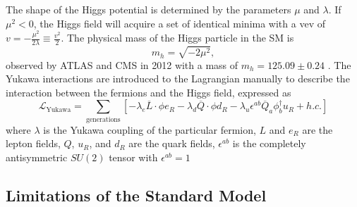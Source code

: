 The shape of the Higgs potential is determined by the parameters $\mu$ and $\lambda$. 
If $\mu^2 < 0$, the Higgs field will acquire a set of identical minima with a vev of 
$v=-\frac{\mu^2}{2\lambda} \equiv \frac{v^2}{2}$. The physical mass of the Higgs particle in the SM is
\begin{equation}
m_h = \sqrt{-2\mu^2},
\label{eq:theory.sm.mh}
\end{equation}
observed by ATLAS and CMS in 2012 with a mass of $m_h = 125.09 \pm 0.24$ \GeV \cite{atlas_higgs,cms_higgs}.
The Yukawa interactions are introduced to the Lagrangian manually to describe the interaction between the fermions and the Higgs field, 
expressed as 
\begin{equation}
 \mathcal{L}_\text{Yukawa} = \sum_\text{generations} \left[-\lambda_e \overline{L} \cdot \phi e_R - \lambda_d \overline{Q} \cdot \phi d_R 
 - \lambda_u \epsilon^{ab} \overline{Q}_a \phi_b^{\dagger} u_R + h.c. \right]
\end{equation}
where $\lambda$ is the Yukawa coupling of the particular fermion, $L$ and $e_R$ are the lepton fields, 
$Q$, $u_R$, and $d_R$ are the quark fields, $\epsilon^{ab} $ is the completely antisymmetric  $ SU\left(2\right) $ tensor with $\epsilon^{ab} = 1$


\subsection{Limitations of the Standard Model}

